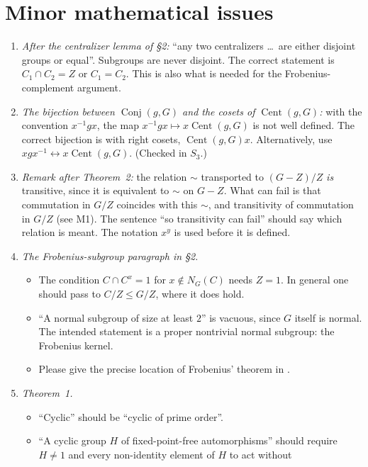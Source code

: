 \documentclass[12pt,letterpaper]{article}
\newcommand{\Cent}{\operatorname{Cent}}
\theoremstyle{definition}
\begin{document}
\section{Minor mathematical issues}

\begin{enumerate}[leftmargin=*,itemsep=2pt]
\item \emph{After the centralizer lemma of \S2:} ``any two centralizers \dots\
  are either disjoint groups or equal''. Subgroups are never disjoint.
  The correct statement is $C_1\cap C_2=Z$ or $C_1=C_2$. This is also
  what is needed for the Frobenius-complement argument.
\item \emph{The bijection between $\operatorname{Conj}(g,G)$ and the
  cosets of $\Cent(g,G)$:} with the convention $x^{-1}gx$, the map
  $x^{-1}gx\mapsto x\Cent(g,G)$ is not well defined. The correct
  bijection is with right cosets, $\Cent(g,G)x$. Alternatively, use
  $xgx^{-1}\leftrightarrow x\Cent(g,G)$. (Checked in $S_3$.)
\item \emph{Remark after Theorem~2:} the relation $\sim$ transported to
  $(G-Z)/Z$ \emph{is} transitive, since it is equivalent to $\sim$ on
  $G-Z$. What can fail is that commutation in $G/Z$ coincides with this
  $\sim$, and transitivity of commutation in $G/Z$ (see M1). The
  sentence ``so transitivity can fail'' should say which relation is
  meant. The notation $x^y$ is used before it is defined.
\item \emph{The Frobenius-subgroup paragraph in \S2.}
  \begin{itemize}[itemsep=0pt]
  \item The condition $C\cap C^x=1$ for $x\notin N_G(C)$ needs $Z=1$.
    In general one should pass to $C/Z\le G/Z$, where it does hold.
  \item ``A normal subgroup of size at least $2$'' is vacuous, since $G$
    itself is normal. The intended statement is a proper nontrivial
    normal subgroup: the Frobenius kernel.
  \item Please give the precise location of Frobenius' theorem in
    \cite{Se}.
  \end{itemize}
\item \emph{Theorem~1.}
  \begin{itemize}[itemsep=0pt]
  \item ``Cyclic'' should be ``cyclic of prime order''.
  \item ``A cyclic group $H$ of fixed-point-free automorphisms'' should
    require $H\ne1$ and every non-identity element of $H$ to act without

\end{itemize}
\end{enumerate}
\end{document}
